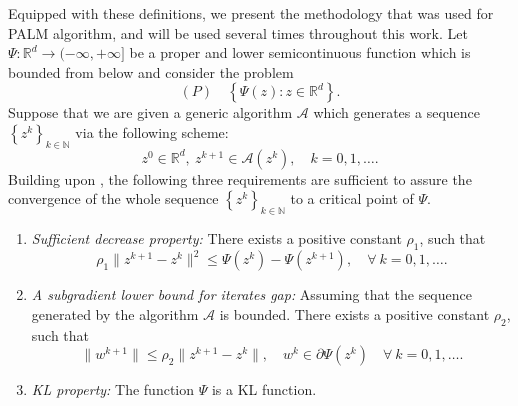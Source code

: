 \documentclass[12pt]{article}
\numberwithin{equation}{section}
\newcommand{\rr}{\mathbb{R}} %
\newcommand{\norm}[1]{\left\Vert {#1} \right\Vert} %
\begin{document}
Equipped with these definitions, we present the methodology that was used for PALM algorithm, and will be used several times throughout this work. Let $\Psi : \rr^d \rightarrow ( -\infty, +\infty ]$ be a proper and lower semicontinuous function which is bounded from below and consider the problem
\begin{equation*}
	(P) \quad \left\lbrace \Psi(z) : z \in \rr^d \right\rbrace .
\end{equation*} 
Suppose that we are given a generic algorithm $\mathcal{A}$ which generates a sequence $\left\lbrace z^k \right\rbrace_{k \in \mathbb{N}}$ via the following scheme:
\begin{equation*}
	z^0 \in \mathbb{R}^d, \: z^{k+1} \in \mathcal{A}\left(z^k\right), \quad k=0,1,\ldots.
\end{equation*}
Building upon \cite{AB2009,ABS2013}, the following three requirements are sufficient to assure the convergence of the whole sequence $\left\lbrace z^k \right\rbrace_{k \in \mathbb{N}}$ to a critical point of $\Psi$.
\begin{enumerate}[(C1)]
	\item \textit{Sufficient decrease property:} There exists a positive constant $\rho_1$, such that
	\begin{equation*}
		\rho_1 \|z^{k+1} - z^k\|^2 \leq \Psi(z^k) - \Psi(z^{k+1}), \quad \forall \: k=0,1,\ldots .
	\end{equation*} \label{C1}
	\item \textit{A subgradient lower bound for iterates gap:} Assuming that the sequence generated by the algorithm $\mathcal{A}$ is bounded. There exists a positive constant $\rho_2$, such that
	\begin{equation*}
		\|w^{k+1}\| \leq \rho_2 \|z^{k+1} - z^k\|, \quad w^k \in \partial \Psi\left( z^k \right) \quad \forall \: k=0,1,\ldots .
	\end{equation*} \label{C2}
	\item \textit{KL property:} The function $\Psi$ is a KL function. \label{C3} 
\end{enumerate}
\end{document}

